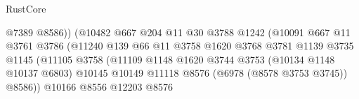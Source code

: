 \begin{lexlean}{RustCore}
\begin{coremodule}
                                                    @7389
                                                    @8586))
                                                (@10482
                                                  @667
                                                  @204
                                                  @11
                                                  @30
                                                  @3788
                                                  @1242
                                                  (@10091
                                                    @667
                                                    @11
                                                    @3761
                                                    @3786
                                                    (@11240
                                                      @139
                                                      @66
                                                      @11
                                                      @3758
                                                      @1620
                                                      @3768
                                                      @3781
                                                      @1139
                                                      @3735
                                                      @1145
                                                      (@11105
                                                        @3758
                                                        (@11109
                                                          @1148
                                                          @1620
                                                          @3744
                                                          @3753
                                                          (@10134 @1148 @10137 @6803)
                                                          @10145
                                                          @10149
                                                          @11118
                                                          @8576
                                                          (@6978 (@8578 @3753 @3745))
                                                          @8586))
                                                      @10166
                                                      @8556
                                                      @12203
                                                      @8576

\end{coremodule}
\end{lexlean}
